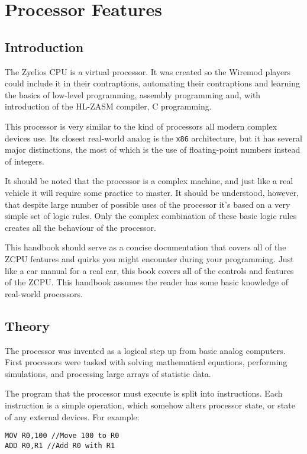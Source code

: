 \chapter{Processor Features}

\section{Introduction}
The Zyelios CPU is a virtual processor. It was created so the Wiremod players could include it in their contraptions, automating their contraptions and learning the basics of low-level programming, assembly programming and, with introduction of the HL-ZASM compiler, C programming.

This processor is very similar to the kind of processors all modern complex devices use. Its closest real-world analog is the \texttt{x86} architecture, but it has several major distinctions, the most of which is the use of floating-point numbers instead of integers.

It should be noted that the processor is a complex machine, and just like a real vehicle it will require some practice to master. It should be understood, however, that despite large number of possible uses of the processor it's based on a very simple set of logic rules. Only the complex combination of these basic logic rules creates all the behaviour of the processor.

This handbook should serve as a concise documentation that covers all of the ZCPU features and quirks you might encounter during your programming. Just like a car manual for a real car, this book covers all of the controls and features of the ZCPU. This handbook assumes the reader has some basic knowledge of real-world processors. %

\section{Theory}
The processor was invented as a logical step up from basic analog computers. First processors were tasked with solving mathematical equations, performing simulations, and processing large arrays of statistic data.

The program that the processor must execute is split into instructions. Each instruction is a simple operation, which somehow alters processor state, or state of any external devices. For example:
\begin{verbatim}
MOV R0,100 //Move 100 to R0
ADD R0,R1 //Add R0 with R1
\end{verbatim}

